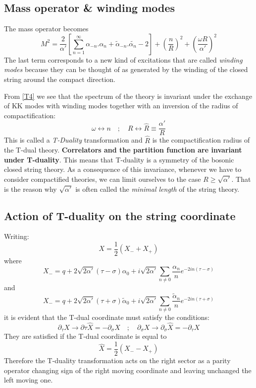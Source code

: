 \subsection{Mass operator \& winding modes}
The mass operator becomes
\begin{equation}
M^2 = \frac{2}{\alpha'}\left[\sum_{n=1}^\infty{\alpha_{-n}.\alpha_n+ \tilde{\alpha}_{-n}.\tilde{\alpha_n} -2}\right]+\left(\frac{n}{R}\right)^2 + \left(\frac{\omega R}{\alpha'}\right)^2
\label{T4}
\end{equation}
The last term corresponds to a new kind of excitations that are called \textit{winding modes} because they can be thought of as generated by the winding of the closed string around the compact direction.
\par From \eqref{T4} we see that the spectrum of the theory is invariant under the exchange of KK modes with winding modes together with an inversion of the radius of compactification:
\begin{equation}
	\omega \leftrightarrow n\quad ; \quad R\leftrightarrow \hat{R}\equiv\frac{\alpha'}{R}
\end{equation}
This is called a \textit{T-Duality} transformation and $\hat{R}$ is the compactification radius of the T-dual theory. \textbf{Correlators and the partition function are invariant under T-duality}. This means that T-duality is a symmetry of the bosonic closed string theory. As a consequence of this invariance, whenever we have to consider compactified theories,
we can limit ourselves to the case $R \geq \sqrt{\alpha'}$. That is the reason why $\sqrt{\alpha'}$ is often called the \textit{minimal length} of the string theory.
\subsection{Action of T-duality on the string coordinate}
Writing:
\begin{equation}
	X = \frac{1}{2}\left(X_-+X_+\right)
\end{equation}
where
\begin{equation}
 X_- = q +2\sqrt{2\alpha'}\left(\tau-\sigma\right)\alpha_0 + i\sqrt{2\alpha'}\sum_{n\neq 0}{\frac{\alpha_n}{n}e^{-2in\left(\tau-\sigma\right)}}	
\end{equation}
and 
\begin{equation}
 X_- = q +2\sqrt{2\alpha'}\left(\tau+\sigma\right)\tilde{\alpha}_0 + i  \sqrt{2\alpha'}\sum_{n\neq 0}{\frac{\tilde{\alpha}_n}{n}e^{-2in\left(\tau+\sigma\right)}}	
\end{equation}
it is evident that the T-dual coordinate must satisfy the conditions:
\begin{equation}
	\partial_\tau X \rightarrow \partial\tau\hat{X} = -\partial_\sigma X\quad ;\quad \partial_\sigma X \rightarrow \partial_\sigma\hat{X} = -\partial_\tau X 
\end{equation}
They are satisfied if the T-dual coordinate is equal to
\begin{equation}
	\hat{X} = \frac{1}{2}\left(X_- - X_+\right)
\end{equation}
Therefore the T-duality transformation acts on the right sector as a parity
operator changing sign of the right moving coordinate and leaving
unchanged the left moving one.
